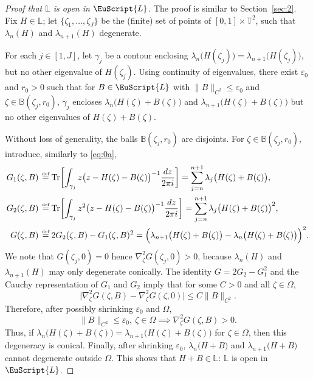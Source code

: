 \documentclass[JEP,XML,SOM,Unicode,NoFloatCountersInSection]{cedram}
\let\pazocal\EuScript
\theoremstyle{definition}
\DeclareMathOperator{\Tr}{Tr}
\newcommand{\LL}{{\pazocal{L}}}
\newcommand{\Bb}{\mathbb{B}}
\newcommand{\Ll}{\mathbb{L}}
\newcommand{\Tt}{{\mathbb{T}}}
\let\epsi\varepsilon
\newcommand{\de}{\,\mathrel{\stackrel{\makebox[0pt]{\mbox{\normalfont\tiny def}}}{=}}}
\begin{document}
\begin{proof}[Proof that $\Ll$ is open in $\LL$] The proof is similar to Section~\ref{sec:2}. Fix $H \in \Ll$; let $\{ \zeta_1, \dots, \zeta_J\}$ be the (finite) set of points of $[0,1] \times \Tt^2$, such that $\lambda_n(H)$ and $\lambda_{n+1}(H)$ degenerate.

For each $j \in [1,J]$, let $\gamma_j$ be a contour enclosing $\lambda_n\bigl(H(\zeta_j)\bigr) = \lambda_{n+1}\bigl(H(\zeta_j)\bigr)$, but no other eigenvalue of $H(\zeta_j)$. Using continuity of eigenvalues, there exist $\epsi_0$ and $r_0 > 0$ such that for $B \in \LL$ with $\| B \|_{C^2} \leq \epsi_0$ and $\zeta \in \Bb(\zeta_j,r_0)$, $\gamma_j$ encloses
$\lambda_n\bigl(H(\zeta) + B(\zeta)\bigr)$ and $\lambda_{n+1}\bigl(H(\zeta) + B(\zeta)\bigr)$ but no other eigenvalues of $H(\zeta) + B(\zeta)$.

Without loss of generality, the balls $\Bb(\zeta_j,r_0)$ are disjoints. For $\zeta \in \Bb(\zeta_j,r_0)$, introduce, similarly to \eqref{eq:0a},
\[
\begin{split}
G_1(\zeta,B) &\de \Tr \biggl[ \int_{\gamma_j} z \bigl(z-H(\zeta)-B(\zeta)\bigr)^{-1} \dfrac{dz}{2\pi i} \biggr] = \sum_{j = n}^{n+1}\lambda_j\bigl(H(\zeta)+B(\zeta)\bigr),
\\
G_2(\zeta,B) &\de \Tr \biggl[ \int_{\gamma_j} z^2 \bigl(z-H(\zeta)-B(\zeta)\bigr)^{-1} \dfrac{dz}{2\pi i} \biggr] = \sum_{j = n}^{n+1} \lambda_j\bigl(H(\zeta)+B(\zeta)\bigr)^2,
\\
G(\zeta,B) &\de 2G_2(\zeta,B) - G_1(\zeta,B)^2 = \Bigl(\lambda_{n+1}\bigl(H(\zeta)+B(\zeta)\bigr) - \lambda_n\bigl(H(\zeta)+B(\zeta)\bigr)\Bigr)^2.
\end{split}
\]
We note that $G(\zeta_j,0) = 0$ hence $\nabla^2_\zeta G(\zeta_j,0) > 0$, because $\lambda_n(H)$ and $\lambda_{n+1}(H)$ may only degenerate conically. The identity $G = 2G_2-G_1^2$ and the Cauchy representation of $G_1$ and $G_2$ imply that for some $C > 0$ and all $\zeta \in \Omega$,
\begin{equation*}
\big| \nabla^2_\zeta G(\zeta,B) - \nabla^2_\zeta G(\zeta,0) \big| \leq C \| B \|_{C^2}.
\end{equation*}
Therefore, after possibly shrinking $\epsi_0$ and $\Omega$,
\begin{equation*}
\| B \|_{C^2} \leq \epsi_0, \ \zeta \in \Omega \implies \nabla^2_\zeta G(\zeta,B) > 0.
\end{equation*}
Thus, if $\lambda_n\bigl(H(\zeta) + B(\zeta)\bigr) = \lambda_{n+1}\bigl(H(\zeta) + B(\zeta)\bigr)$ for $\zeta\in \Omega$, then this degeneracy is conical. Finally, after shrinking $\epsi_0$, $\lambda_n\bigl(H + B\bigr)$ and $\lambda_{n+1}\bigl(H + B\bigr)$ cannot degenerate outside $\Omega$. This shows that $H+B \in \Ll$: $\Ll$ is open in $\LL$.
\end{proof}
\end{document}
